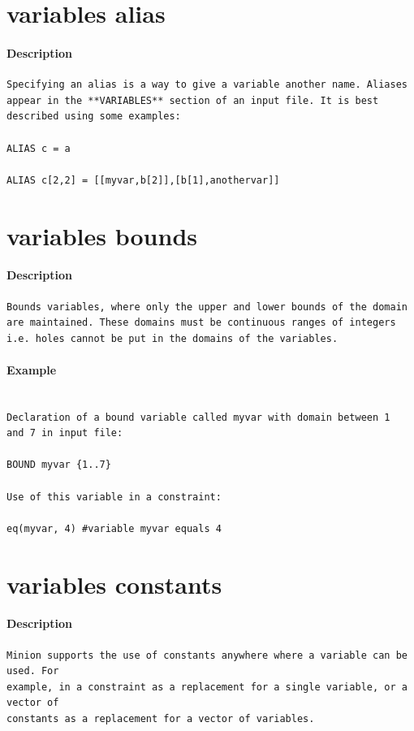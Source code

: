 \documentclass[oneside]{book}
\begin{document}
\section{variables alias}
\paragraph{Description}
{\footnotesize
\begin{verbatim}
Specifying an alias is a way to give a variable another name. Aliases
appear in the **VARIABLES** section of an input file. It is best
described using some examples:

ALIAS c = a

ALIAS c[2,2] = [[myvar,b[2]],[b[1],anothervar]]
\end{verbatim}
}
\section{variables bounds}
\paragraph{Description}
{\footnotesize
\begin{verbatim}
Bounds variables, where only the upper and lower bounds of the domain
are maintained. These domains must be continuous ranges of integers
i.e. holes cannot be put in the domains of the variables.
\end{verbatim}
}
\paragraph{Example}
{\footnotesize
\begin{verbatim}

Declaration of a bound variable called myvar with domain between 1
and 7 in input file:

BOUND myvar {1..7}

Use of this variable in a constraint:

eq(myvar, 4) #variable myvar equals 4
\end{verbatim}
}
\section{variables constants}
\paragraph{Description}
{\footnotesize
\begin{verbatim}
Minion supports the use of constants anywhere where a variable can be used. For
example, in a constraint as a replacement for a single variable, or a vector of
constants as a replacement for a vector of variables.
\end{verbatim}
}
\end{document}

